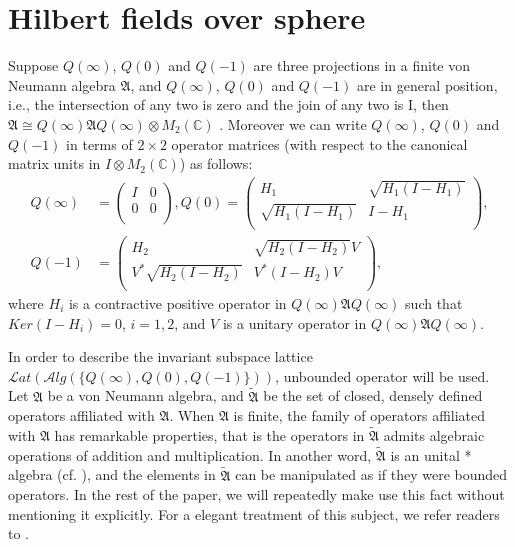 \documentclass[a4paper,10pt]{amsart}
\newcommand{\AAA}{\mathfrak A}
\newcommand{\Lat}{\mathcal Lat}
\newcommand{\Alg}{\mathcal Alg}
\newcommand{\C}{\mathbb C} %
\begin{document}
\section{Hilbert fields over sphere}
Suppose $Q(\infty)$, $Q(0)$ and $Q(-1)$ are three projections in a finite 
von Neumann algebra $\AAA$, and $Q(\infty)$, $Q(0)$ and $Q(-1)$ are 
in general position, i.e., the intersection of any two is zero and 
the join of 
any two is I, then $\AAA \cong Q(\infty)\AAA Q(\infty) \otimes M_{2}(\C)$
\cite[Proposition 2.4]{Hou}.
Moreover we can write $Q(\infty)$, $Q(0)$ and $Q(-1)$ in terms 
of $2 \times 2$ operator matrices (with respect to the canonical matrix 
units in $I \otimes M_{2}(\C)$) as follows:
\begin{equation}\label{eq0}
\begin{split}
    Q(\infty)&= \left(
        \begin{array}{cc}
          I & 0 \\
          0 & 0 \\
        \end{array}
      \right),
      Q(0) = \left(
          \begin{array}{cc}
            H_{1} & \sqrt{H_{1}(I-H_{1})} \\
            \sqrt{H_{1}(I-H_{1})} & I-H_{1} \\
          \end{array}
        \right) , \\
        Q(-1)&= \left(
          \begin{array}{cc}
            H_{2} & \sqrt{H_{2}(I-H_{2})}V \\
            V^{*}\sqrt{H_{2}(I-H_{2})} & V^{*}(I-H_{2})V \\
          \end{array}
        \right),
\end{split}
\end{equation}
where $H_i$ is a contractive positive operator in $Q(\infty)\AAA Q(\infty)$ 
such that $Ker(I - H_i) = 0$, $i = 1, 2$, and $V$ is a unitary operator 
in $Q(\infty)\AAA Q(\infty)$. 

In order to describe the invariant subspace lattice 
$\Lat(\Alg(\{Q(\infty), Q(0), Q(-1)\}))$, 
unbounded operator will be used. Let $\AAA$ be a von Neumann algebra, and
$\widetilde{\AAA}$ be the set of closed, densely defined operators 
affiliated with $\AAA$. When $\AAA$ is finite, the family of operators 
affiliated with $\AAA$ has remarkable properties, that is the operators in 
$\widetilde{\AAA}$ admits algebraic operations of addition and multiplication.
In another word,  $\widetilde{\AAA}$ is an unital * algebra (cf. \cite{MV2}), 
and the elements in $\widetilde{\AAA} $ can be manipulated as if they were bounded
operators. In the rest of the paper, we will repeatedly make use this fact 
without mentioning it explicitly. For a elegant treatment of this subject, 
we refer readers to \cite{Zhe}. 
\end{document}
